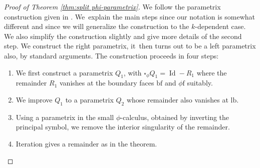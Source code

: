 \documentclass[11pt]{article}
\numberwithin{equation}{section}
\theoremstyle{plain}
\theoremstyle{definition}
\newcommand{\phif}{{\phi\mathrm{f}}}
\newcommand{\lf}{{\mathrm{lb}}}
\newcommand{\bbf}{{\mathrm{bf}}}
\DeclareMathOperator{\Id}{Id}
\begin{document}
\begin{proof}[Proof of Theorem \ref{thm:split phi-parametrix}]
We follow the parametrix construction given in \cite{grieser-para}. We~explain the main steps since our notation is somewhat different and since we will generalize the construction to the $k$-dependent case. We also simplify the construction slightly and give more details of the second step. We construct the right parametrix, it~then turns out to be a left parametrix also, by standard arguments. The construction proceeds in four steps:
\begin{enumerate}
\item[Step 1:] We first construct a parametrix $Q_1$, with $\square_\phi Q_1 = \Id - R_1$
where the remain\-der $R_1$ vanishes at the boundary faces $\bbf$ and $\phif$ suitably.
\item[Step 2:] We improve $Q_1$ to a parametrix $Q_2$ whose remainder also vanishes at $\lf$.
\item[Step 3:] Using a parametrix in the small $\phi$-calculus, obtained by inverting the principal symbol,
we remove the interior singularity of the remainder.
\item[Step 4:] Iteration gives a remainder as in the theorem.
\end{enumerate}


\end{proof}
\end{document}
